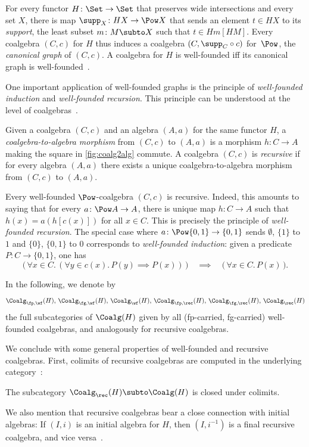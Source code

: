 \begin{example}
For every functor $H\colon \Set\to \Set$ that preserves wide intersections and every set $X$, there is map $\supp_X\colon HX\to \Pow X$ that sends an element $t\in HX$ to its \emph{support}, the least subset $m\colon M\subto X$ such that $t\in Hm[HM]$. Every coalgebra $(C,c)$ for $H$ thus induces a coalgebra $(C,\supp_C\circ c)$ for~$\Pow$, the \emph{canonical graph} of $(C,c)$. A coalgebra for $H$ is well-founded iff its canonical graph is well-founded~\cite[Rem.~6.3.4]{taylor99}.
\end{example}
One important application of well-founded graphs is the principle of \emph{well-founded induction} and \emph{well-founded recursion}. This principle can be understood at the level of coalgebras~\cite{taylor99}. 

Given a coalgebra $(C,c)$ and an algebra $(A,a)$ for the same functor $H$, a \emph{coalgebra-to-algebra morphism} from $(C,c)$ to $(A,a)$ is a morphism $h\colon C\to A$ making the square in \autoref{fig:coalg2alg} commute. A coalgebra $(C,c)$ is \emph{recursive} if for every algebra $(A,a)$ there exists a unique coalgebra-to-algebra morphism from $(C,c)$ to $(A,a)$.

\begin{example}[Graphs]
Every well-founded $\Pow$-coalgebra $(C,c)$ is recursive. Indeed, this amounts to saying that for every $a\colon \Pow A \to A$, there is unique map $h\colon C\to A$ such that $h(x)=a(h[c(x)])$ for all $x\in C$. This is precisely the principle of \emph{well-founded recursion}. The special case where $a\colon \Pow\{0,1\}\to \{0,1\}$ sends $\emptyset$, $\{1\}$ to $1$ and $\{0\}$, $\{0,1\}$ to $0$ corresponds to \emph{well-founded induction}: given a predicate $P\colon C\to \{0,1\}$, one has
\[ \big(\,\forall x\in C.\, (\forall y\in c(x).\, P(y) \implies P(x))\,\big) \quad\implies\quad \big(\,\forall x\in C.\, P(x)\,\big). \] 
\end{example}
\noindent
In the following, we denote by
\[\Coalg_{\fp,\wf}(H),\, \Coalg_{\fg,\wf}(H),\, \Coalg_\wf(H),\, \Coalg_{\fp,\rec}(H),\, \Coalg_{\fg,\rec}(H),\, \Coalg_\rec(H) \] 
the full subcategories of $\Coalg(H)$ given by all (fp-carried, fg-carried)  well-founded coalgebras, and analogously for recursive coalgebras. 

We conclude with some general properties of well-founded and recursive coalgebras. First, colimits of recursive coalgebras are computed in the underlying category~\cite[Prop.~7.1.9]{amm25}:
\begin{lemma}\label{lem:rec-coalg-colimits}
The subcategory $\Coalg_\rec(H)\subto \Coalg(H)$ is closed under colimits.
\end{lemma}
We also mention that recursive coalgebras bear a close connection with initial algebras: If $(I,i)$ is an initial algebra for $H$, then $(I,i^{-1})$ is a final recursive coalgebra, and vice versa~\cite{cuv06}.

